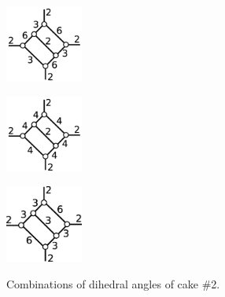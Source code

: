 \documentclass[suppldata, dvipdfmx]{interact}
\theoremstyle{plain}%
\theoremstyle{definition}
\theoremstyle{remark}
\theoremstyle{problemstyle}
\begin{document}
\begin{figure}[h!tbp]
  \begin{minipage}[t]{0.23\textwidth}
   \centering
   \includegraphics[width=1in,
   keepaspectratio]{./img/HexahedraWithSphericalFaces/hexahedralCake2/a.jpg}
   \label{fig:cake2a}
  \end{minipage}
  \hspace*{\fill}
  \begin{minipage}[t]{0.23\textwidth}
   \centering
   \includegraphics[width=1in, keepaspectratio]{./img/HexahedraWithSphericalFaces/hexahedralCake2/b.jpg}
   \label{fig:cake2b}
  \end{minipage}
 \hspace*{\fill}
  \begin{minipage}[t]{0.23\textwidth}
   \centering
   \includegraphics[width=1in, keepaspectratio]{./img/HexahedraWithSphericalFaces/hexahedralCake2/c.jpg}
   \label{fig:cake2c}
  \end{minipage}
 \hspace*{\fill}
  \caption{Combinations of dihedral angles of cake \#2.}
  \label{fig:cake2List}
\end{figure}
\end{document}

